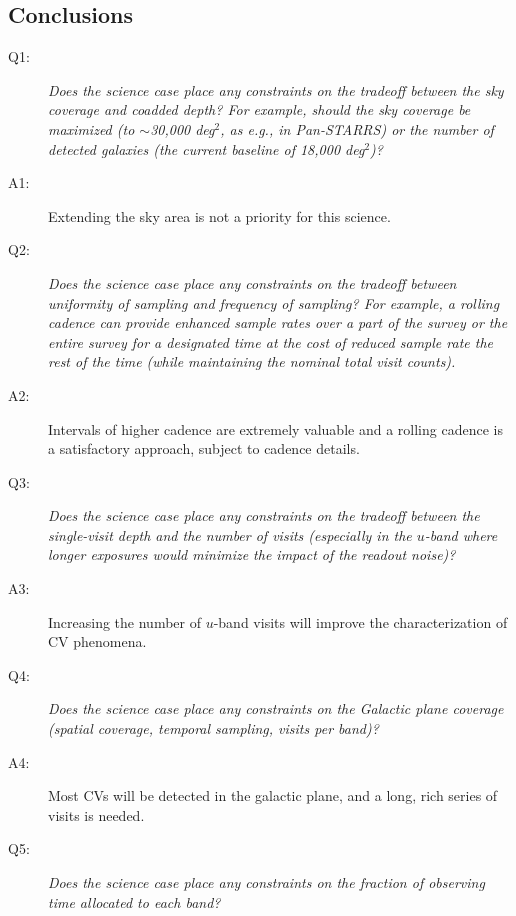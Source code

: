 \subsection{Conclusions}
%
%
 \begin{description}

 \item[Q1:] {\it Does the science case place any constraints on the
 tradeoff between the sky coverage and coadded depth? For example, should
 the sky coverage be maximized (to $\sim$30,000 deg$^2$, as e.g., in
 Pan-STARRS) or the number of detected galaxies (the current baseline
 of 18,000 deg$^2$)?}

 \item[A1:] Extending the sky area is not a priority for this science.

 \item[Q2:] {\it Does the science case place any constraints on the
 tradeoff between uniformity of sampling and frequency of  sampling? For
 example, a rolling cadence can provide enhanced sample rates over a part
 of the survey or the entire survey for a designated time at the cost of
 reduced sample rate the rest of the time (while maintaining the nominal
 total visit counts).}

 \item[A2:] Intervals of higher cadence are extremely valuable and a rolling cadence is a
satisfactory approach, subject to cadence details.

 \item[Q3:] {\it Does the science case place any constraints on the
 tradeoff between the single-visit depth and the number of visits
 (especially in the $u$-band where longer exposures would minimize the
 impact of the readout noise)?}

 \item[A3:] Increasing the number of $u$-band visits will improve the characterization of CV phenomena.

 \item[Q4:] {\it Does the science case place any constraints on the
 Galactic plane coverage (spatial coverage, temporal sampling, visits per
 band)?}

 \item[A4:] Most CVs will be detected in the galactic plane, and a long, rich series of visits is needed.

 \item[Q5:] {\it Does the science case place any constraints on the
 fraction of observing time allocated to each band?}


\end{description}
